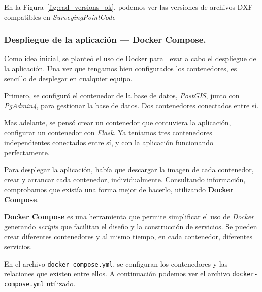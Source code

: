 
En la Figura~\ref{fig:cad_versions_ok}, podemos ver las versiones de archivos DXF
compatibles en \emph{SurveyingPointCode}

\subsubsection{Despliegue de la aplicación --- Docker Compose.}

Como idea inicial, se planteó el uso de Docker para llevar a cabo el despliegue de la aplicación. Una vez que tengamos bien configurados los contenedores, es sencillo de desplegar en cualquier equipo.

Primero, se configuró el contenedor  de la base de datos, \emph{PostGIS}, junto con \emph{PgAdmin4}, para gestionar la base de datos. Dos contenedores conectados entre sí.

Mas adelante, se pensó crear un contenedor que contuviera la aplicación, configurar un contenedor con \emph{Flask}. Ya teníamos tres contenedores independientes conectados entre sí, y con la aplicación funcionando perfectamente.

Para desplegar la aplicación, había que descargar la imagen de cada contenedor, crear y arrancar cada contenedor, individualmente. Consultando información, comprobamos que existía una forma mejor de hacerlo, utilizando \textbf{Docker Compose}. 

\textbf{Docker Compose} es una herramienta que permite simplificar el uso de \emph{Docker} generando \emph{scripts} que facilitan el diseño y la construcción de servicios. Se pueden crear diferentes contenedores y al mismo tiempo, en cada contenedor, diferentes servicios.

En el archivo \texttt{docker-compose.yml}, se configuran los contenedores y las relaciones que existen entre ellos. A continuación podemos ver el archivo \texttt{docker-compose.yml} utilizado.


